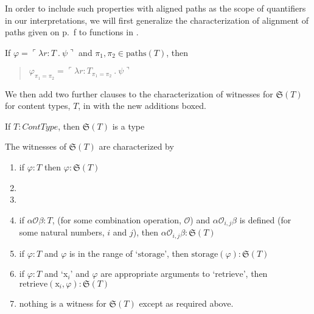 In order to include such properties with aligned paths as the scope of
quantifiers in our interpretations, we will first generalize the
characterization of alignment of paths given on
p.~\pageref{pg:path-alignment-types}f to functions in \nexteg{}.
\begin{ex} 
  If $\varphi=\ulcorner\lambda r\!:\!T\ .\ \psi\urcorner$ and
  $\pi_1,\pi_2\in\mathrm{paths}(T)$, then
  \begin{quote}
    $\varphi_{\pi_1=\pi_2}=\ulcorner\lambda r\!:\!T_{\pi_1=\pi_2}\ .\
    \psi\urcorner$
  \end{quote}
\end{ex} 
We then add two further clauses to the characterization of witnesses
for $\mathfrak{S}(T)$ for content types, $T$, in \nexteg{} with the
new additions boxed.
\begin{ex} 
\begin{subex} 
 
\item If $T:\textit{ContType}$, then $\mathfrak{S}(T)$ is a type 
 
\item The witnesses of $\mathfrak{S}(T)$ are characterized by
  \begin{enumerate} 
 
  \item if $\varphi:T$ then $\varphi:\mathfrak{S}(T)$
    
  \item \fbox{if $\varphi:\mathfrak{S}(T)$ and $\varphi:\textit{PPpty}$,
      then $\mathcal{L}(\varphi):\mathfrak{S}(T)$}
    
  \item {}

    
  \item if $\alpha\mathcal{O}\beta:T$, (for
      some combination operation, $\mathcal{O}$) and
      $\alpha\mathcal{O}_{i,j}\beta$ is defined (for some natural
      numbers, $i$ and $j$), then $\alpha\mathcal{O}_{i,j}\beta:\mathfrak{S}(T)$
 
  \item if $\varphi:T$ and $\varphi$ is in the range of `$\mathrm{storage}$', then
    $\mathrm{storage}(\varphi):\mathfrak{S}(T)$

  \item if $\varphi:T$ and `x$_i$' and $\varphi$ are appropriate
    arguments to `$\mathrm{retrieve}$', then
    $\mathrm{retrieve}(\text{x}_i,\varphi):\mathfrak{S}(T)$
    
  \item nothing is a witness for $\mathfrak{S}(T)$ except as required above.
 
  \end{enumerate} 
  
 
\end{subex} 
\label{ex:storage-donkey-type}   
\end{ex}

